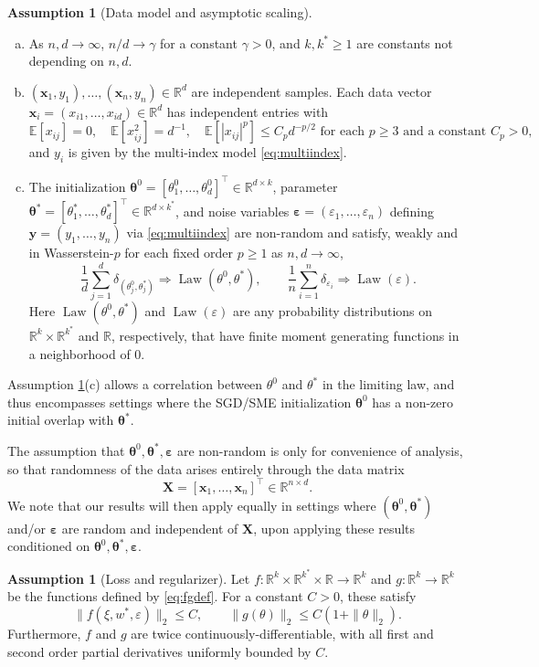\documentclass[11pt,letterpaper,reqno]{amsart}
\theoremstyle{definition}
\newtheorem{asp}[thm]{Assumption}
\def\eps{\varepsilon}
\def\E{\mathbb{E}}
\def\R{\mathbb{R}}
\def\Law{\operatorname{Law}}
\def\x{\mathbf{x}}
\def\y{\mathbf{y}}
\def\X{\mathbf{X}}
\def\beps{\boldsymbol{\varepsilon}}
\def\btheta{\boldsymbol{\theta}}
\begin{document}
\begin{asp}[Data model and asymptotic scaling]\label{asp:model}
\phantom{ }
\begin{enumerate}[(a)]
\item As $n,d \to \infty$, $n/d \to \gamma$ for a constant $\gamma>0$, and
$k,k^* \geq 1$ are constants not depending on $n,d$.
\item $(\x_1,y_1),\ldots,(\x_n,y_n) \in \R^d$ are independent samples.
Each data vector $\x_i=(x_{i1},\ldots,x_{id}) \in \R^d$ has independent entries
with
\[\E[x_{ij}]=0, \quad \E[x_{ij}^2]=d^{-1}, \quad \E[|x_{ij}|^p] \leq
C_pd^{-p/2} \text{ for each $p \geq 3$ and a constant $C_p>0$},\]
and $y_i$ is given by the multi-index model \eqref{eq:multiindex}.
\item The initialization $\btheta^0=[\theta_1^0,\ldots,\theta_d^0]^\top
\in \R^{d \times k}$, parameter
$\btheta^*=[\theta_1^*,\ldots,\theta_d^*]^\top \in \R^{d \times k^*}$,
and noise variables $\beps=(\eps_1,\ldots,\eps_n)$ defining
$\y=(y_1,\ldots,y_n)$ via \eqref{eq:multiindex} are non-random and satisfy,
weakly and in Wasserstein-$p$ for each fixed order $p \geq 1$ as $n,d \to
\infty$,
\[\frac{1}{d}\sum_{j=1}^d \delta_{(\theta_j^0,\theta_j^*)} \Rightarrow
\Law(\theta^0,\theta^*),
\qquad \frac{1}{n}\sum_{i=1}^n \delta_{\eps_i} \Rightarrow \Law(\eps).\]
Here $\Law(\theta^0,\theta^*)$ and $\Law(\eps)$ are any probability
distributions on $\R^k \times \R^{k^*}$ and $\R$, respectively, that have
finite moment generating functions in a neighborhood of 0.
\end{enumerate}
\end{asp}

Assumption \ref{asp:model}(c) allows a correlation between $\theta^0$ and
$\theta^*$ in the limiting law, and thus encompasses settings where the SGD/SME
initialization $\btheta^0$ has a non-zero initial overlap with $\btheta^*$.

The assumption that $\btheta^0,\btheta^*,\beps$ are non-random is only for
convenience of analysis, so that randomness of the data arises entirely through
the data matrix
\[\X=[\x_1,\ldots,\x_n]^\top \in \R^{n \times d}.\]
We note that our results will then apply equally in settings where
$(\btheta^0,\btheta^*)$ and/or $\beps$ are random and independent of $\X$, upon
applying these results conditioned on $\btheta^0,\btheta^*,\beps$.

\begin{asp}[Loss and regularizer]\label{asp:lipschitz}
Let $f:\R^k \times \R^{k^*} \times \R \to \R^k$ and $g:\R^k \to \R^k$ be the
functions defined by \eqref{eq:fgdef}. For a constant $C>0$, these satisfy
\[\|f(\xi,w^*,\eps)\|_2 \leq C,
\qquad \|g(\theta)\|_2 \leq C(1+\|\theta\|_2).\]
Furthermore, $f$ and $g$ are twice continuously-differentiable,
with all first and second order partial derivatives uniformly bounded by $C$.
\end{asp}
\end{document}
